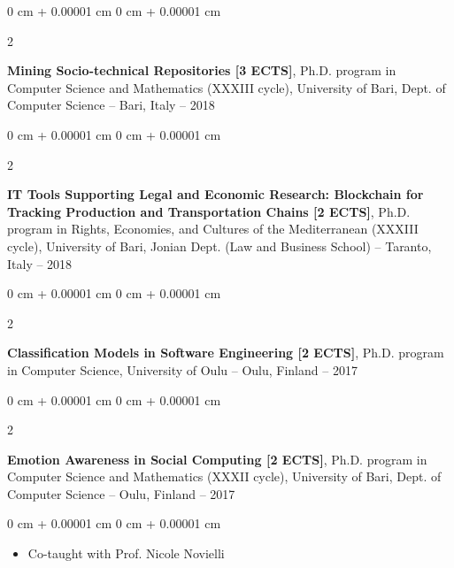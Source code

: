 \documentclass[10pt, a4paper]{article}
\newenvironment{highlights}{
    \begin{itemize}[
        topsep=0.10 cm,
        parsep=0.10 cm,
        partopsep=0pt,
        itemsep=0pt,
        leftmargin=0 cm + 10pt
    ]
}{
    \end{itemize}
} %
\newenvironment{onecolentry}{
    \begin{adjustwidth}{
        0 cm + 0.00001 cm
    }{
        0 cm + 0.00001 cm
    }
}{
    \end{adjustwidth}
} %
\newenvironment{twocolentry}[2][]{
    \onecolentry
    \def\secondColumn{#2}
    \setcolumnwidth{\fill, 4.5 cm}
    \begin{paracol}{2}
}{
    \switchcolumn \raggedleft \secondColumn
    \end{paracol}
    \endonecolentry
} %
\begin{document}
        \vspace{0.2 cm}

        \begin{twocolentry}{
            2017 – 2018
        }
            \textbf{Mining Socio-technical Repositories [3 ECTS]}, Ph.D. program in Computer Science and Mathematics (XXXIII cycle), University of Bari, Dept. of Computer Science -- Bari, Italy\end{twocolentry}



        \vspace{0.2 cm}

        \begin{twocolentry}{
            2017 – 2018
        }
            \textbf{IT Tools Supporting Legal and Economic Research: Blockchain for Tracking Production and Transportation Chains [2 ECTS]}, Ph.D. program in Rights, Economies, and Cultures of the Mediterranean (XXXIII cycle), University of Bari, Jonian Dept. (Law and Business School) -- Taranto, Italy\end{twocolentry}



        \vspace{0.2 cm}

        \begin{twocolentry}{
            2016 – 2017
        }
            \textbf{Classification Models in Software Engineering [2 ECTS]}, Ph.D. program in Computer Science, University of Oulu -- Oulu, Finland\end{twocolentry}



        \vspace{0.2 cm}

        \begin{twocolentry}{
            2016 – 2017
        }
            \textbf{Emotion Awareness in Social Computing [2 ECTS]}, Ph.D. program in Computer Science and Mathematics (XXXII cycle), University of Bari, Dept. of Computer Science -- Oulu, Finland\end{twocolentry}

        \vspace{0.10 cm}
        \begin{onecolentry}
            \begin{highlights}
                \item Co-taught with Prof. Nicole Novielli
            \end{highlights}
        \end{onecolentry}
\end{document}

